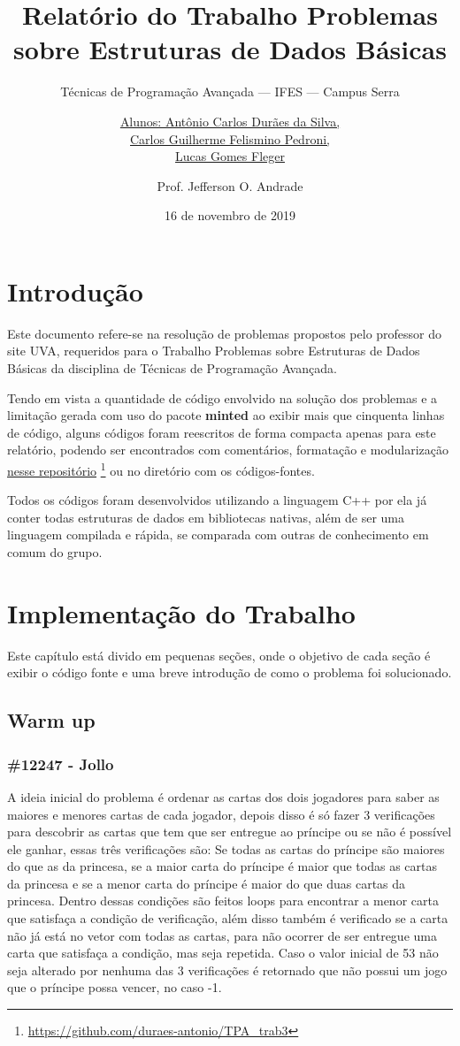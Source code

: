 \documentclass[a4paper,12pt]{scrartcl}
\title{Relatório do Trabalho Problemas sobre Estruturas de Dados Básicas}
\subtitle{Técnicas de Programação Avançada --- IFES --- Campus Serra}
\author{
    \uline{
        Alunos: Antônio Carlos Durães da Silva,
        \\Carlos Guilherme Felismino Pedroni,
        \\Lucas Gomes Fleger}
  \and Prof. Jefferson O. Andrade}
\date{16 de novembro de 2019}
\begin{document}
\maketitle
\tableofcontents 
\listoflistings
\listoffigures

\section{Introdução}

Este documento refere-se na resolução de problemas propostos pelo professor do site UVA, requeridos para o Trabalho Problemas sobre Estruturas de Dados Básicas da disciplina de Técnicas de Programação Avançada.

Tendo em vista a quantidade de código envolvido na solução dos problemas e a limitação gerada com uso do pacote \textbf{minted} ao exibir mais que cinquenta linhas de código, alguns códigos foram reescritos de forma compacta apenas para este relatório, podendo ser encontrados com comentários, formatação e modularização \href{https://github.com/duraes-antonio/TPA_trab3}{nesse repositório} \footnote{\url{https://github.com/duraes-antonio/TPA_trab3}} ou no diretório com os códigos-fontes.

Todos os códigos foram desenvolvidos utilizando a linguagem C++ por ela já conter todas estruturas de dados em bibliotecas nativas, além de ser uma linguagem compilada e rápida, se comparada com outras de conhecimento em comum do grupo.

\section{Implementação do Trabalho}

Este capítulo está divido em pequenas seções, onde o objetivo de cada seção é exibir o código fonte e uma breve introdução de como o problema foi solucionado.

\subsection{Warm up}
\subsubsection{\#12247 - Jollo}
A ideia inicial do problema é ordenar as cartas dos dois jogadores para saber as maiores e menores cartas de cada jogador, depois disso é só fazer 3 verificações para descobrir as cartas que tem que ser entregue ao príncipe ou se não é possível ele ganhar, essas três verificações são: Se todas as cartas do príncipe são maiores do que as da princesa, se a maior carta do príncipe é maior que todas as cartas da princesa e se a menor carta do príncipe é maior do que duas cartas da princesa.
Dentro dessas condições são feitos loops para encontrar a menor carta que satisfaça a condição de verificação, além disso também é verificado se a carta não já está no vetor com todas as cartas, para não ocorrer de ser entregue uma carta que satisfaça a condição, mas seja repetida. Caso o valor inicial de 53 não seja alterado por nenhuma das 3 verificações é retornado que não possui um jogo que o príncipe possa vencer, no caso -1.
\end{document}
